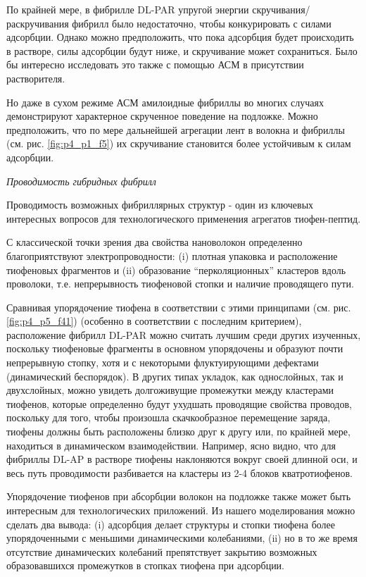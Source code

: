     По крайней мере, в фибрилле DL-PAR упругой энергии скручивания/раскручивания фибрилл было недостаточно, чтобы конкурировать с силами адсорбции. Однако можно предположить, что пока адсорбция будет происходить в растворе, силы адсорбции будут ниже, и скручивание может сохраниться. Было бы интересно исследовать это также с помощью АСМ в присутствии растворителя.
    
    Но даже в сухом режиме АСМ амилоидные фибриллы во многих случаях демонстрируют характерное скрученное поведение на подложке. Можно предположить, что по мере дальнейшей агрегации лент в волокна и фибриллы (см. рис. \ref{fig:p4_p1_f5}) их скручивание становится более устойчивым к силам адсорбции.
    
    \emph{Проводимость гибридных фибрилл}
    
    Проводимость возможных фибриллярных структур - один из ключевых интересных вопросов для технологического применения агрегатов тиофен-пептид.
    
    С классической точки зрения два свойства нановолокон определенно благоприятствуют электропроводности: (i) плотная упаковка и расположение тиофеновых фрагментов и (ii) образование ``перколяционных'' кластеров вдоль проволоки, т.е. непрерывность тиофеновой стопки и наличие проводящего пути.
    
    Сравнивая упорядочение тиофена в соответствии с этими принципами (см. рис. \ref{fig:p4_p5_f41}) (особенно в соответствии с последним критерием), расположение фибрилл DL-PAR можно считать лучшим среди других изученных, поскольку тиофеновые фрагменты в основном упорядочены и образуют почти непрерывную стопку, хотя и с некоторыми флуктуирующими дефектами (динамический беспорядок). В других типах укладок, как однослойных, так и двухслойных, можно увидеть долгоживущие промежутки между кластерами тиофенов, которые определенно будут ухудшать проводящие свойства проводов, поскольку для того, чтобы произошла скачкообразное перемещение заряда, тиофены должны быть расположены близко друг к другу или, по крайней мере, находиться в динамическом взаимодействии. Например, ясно видно, что для фибриллы DL-AP в растворе тиофены наклоняются вокруг своей длинной оси, и весь путь проводимости разбивается на кластеры из 2-4 блоков кватротиофенов.

    Упорядочение тиофенов при абсорбции волокон на подложке также может быть интересным для технологических приложений. Из нашего моделирования можно сделать два вывода: (i) адсорбция делает структуры и стопки тиофена более упорядоченными с меньшими динамическими колебаниями, (ii) но в то же время отсутствие динамических колебаний препятствует закрытию возможных образовавшихся промежутков в стопках тиофена при адсорбции.

